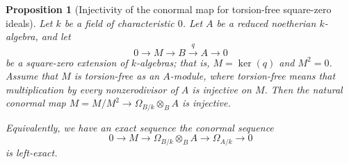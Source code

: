 \documentclass[11pt,twoside]{amsart}
\theoremstyle{plain}
\numberwithin{equation}{section}
\newtheorem{proposition}[theorem]{Proposition}
\theoremstyle{definition}
\begin{document}
\begin{proposition}[Injectivity of the conormal map for torsion-free square-zero ideals]
\label{prop:injectivity-conormal-map}
Let \(k\) be a field of characteristic \(0\). Let \(A\) be a reduced noetherian
\(k\)-algebra, and let
\[
    0\longrightarrow M\longrightarrow B\xrightarrow{q} A\longrightarrow 0
\]
be a square-zero extension of \(k\)-algebras; that is, \(M=\ker(q)\) and \(M^2=0\).
Assume that \(M\) is torsion-free as an \(A\)-module, where torsion-free means that
multiplication by every nonzerodivisor of \(A\) is injective on \(M\). Then the natural
conormal map \(M=M/M^2\to \Omega_{B/k}\otimes_B A\) is injective.

Equivalently, we have an exact sequence the conormal sequence
\[
  0 \longrightarrow  M
    \longrightarrow
    \Omega_{B/k}\otimes_B A
    \longrightarrow
    \Omega_{A/k}
    \longrightarrow 0
\]
is left-exact.
\end{proposition}
\end{document}

